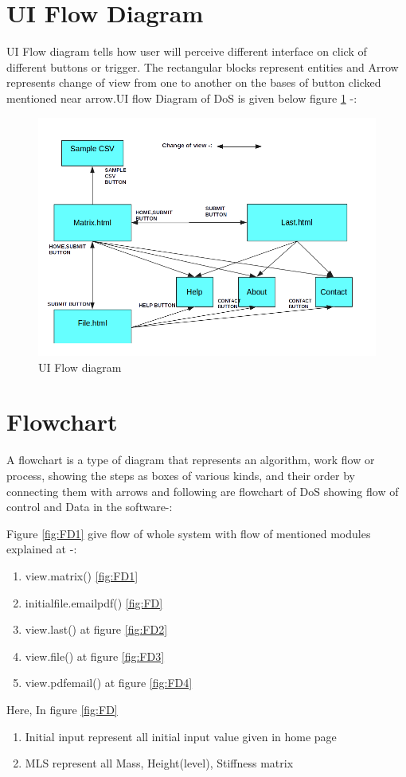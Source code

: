 \section{UI Flow Diagram}
UI Flow diagram tells how user will perceive different interface on click of different buttons or trigger. The rectangular blocks represent entities and Arrow represents change of view from one to another on the bases of button clicked mentioned near arrow.UI flow Diagram of DoS is given below figure \ref{fig:UI1} -: 
\begin{figure}[H]
\centering \includegraphics[scale=0.55]{images/UI.png}
\caption{UI Flow diagram}
\label{fig:UI1}
\end{figure}
\section{Flowchart}
A flowchart is a type of diagram that represents an algorithm, work flow or process, showing the steps as boxes of various kinds, and their order by connecting them with arrows
and following are flowchart of DoS showing flow of control and Data in the software-:

Figure \ref{fig:FD1} give flow of whole system with flow of mentioned modules explained at -:
\begin{enumerate}
\item view.matrix() \ref{fig:FD1}
\item initialfile.emailpdf() \ref{fig:FD}
\item view.last() at figure \ref{fig:FD2}
\item view.file() at figure \ref{fig:FD3}
\item view.pdfemail() at figure \ref{fig:FD4}
\end{enumerate}
Here, In figure \ref{fig:FD}
\begin{enumerate}
\item Initial input represent all initial input value given in home page
\item MLS represent all Mass, Height(level), Stiffness matrix
\end{enumerate}

